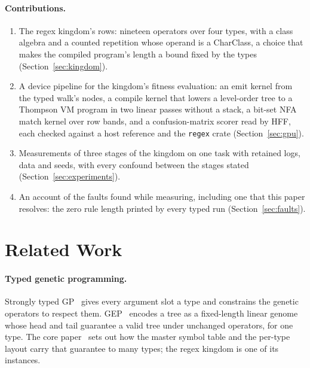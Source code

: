 \documentclass[sigconf,nonacm]{acmart}
\newcommand{\ty}[1]{\textsf{#1}}
\begin{document}
\paragraph{Contributions.}
\begin{enumerate}
\item The regex kingdom's rows: nineteen operators over four types, with a class
algebra and a counted repetition whose operand is a \ty{CharClass}, a choice that
makes the compiled program's length a bound fixed by the types
(Section~\ref{sec:kingdom}).
\item A device pipeline for the kingdom's fitness evaluation: an emit kernel from
the typed walk's nodes, a compile kernel that lowers a level-order tree to a
Thompson VM program in two linear passes without a stack, a bit-set NFA match
kernel over row bands, and a confusion-matrix scorer read by HFF, each checked
against a host reference and the \texttt{regex} crate
(Section~\ref{sec:gpu}).
\item Measurements of three stages of the kingdom on one task with retained logs,
data and seeds, with every confound between the stages stated
(Section~\ref{sec:experiments}).
\item An account of the faults found while measuring, including one that this
paper resolves: the zero rule length printed by every typed run
(Section~\ref{sec:faults}).
\end{enumerate}

\section{Related Work}
\label{sec:related}

\paragraph{Typed genetic programming.} Strongly typed GP~\cite{montana1995stgp}
gives every argument slot a type and constrains the genetic operators to respect
them. GEP~\cite{ferreira2001gep,ferreira2006book} encodes a tree as a fixed-length
linear genome whose head and tail guarantee a valid tree under unchanged
operators, for one type. The core paper~\cite{morgan_core} sets out how the
master symbol table and the per-type layout carry that guarantee to many types;
the regex kingdom is one of its instances.
\end{document}

